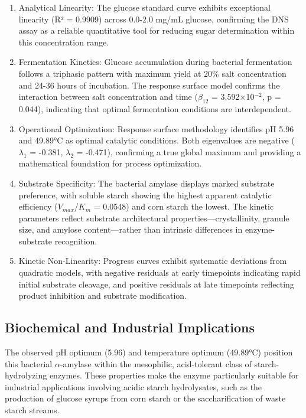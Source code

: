 \documentclass[
  12pt,
]{article}
\begin{document}
\begin{enumerate}
\def\labelenumi{\arabic{enumi}.}
\item
  Analytical Linearity: The glucose standard curve exhibits exceptional
  linearity (R² = 0.9909) across 0.0-2.0 mg/mL glucose, confirming the
  DNS assay as a reliable quantitative tool for reducing sugar
  determination within this concentration range.
\item
  Fermentation Kinetics: Glucose accumulation during bacterial
  fermentation follows a triphasic pattern with maximum yield at 20\%
  salt concentration and 24-36 hours of incubation. The response surface
  model confirms the interaction between salt concentration and time
  (\(\beta_{12}\) = 3.592×10\(^{-2}\), p = 0.044), indicating that
  optimal fermentation conditions are interdependent.
\item
  Operational Optimization: Response surface methodology identifies pH
  5.96 and 49.89°C as optimal catalytic conditions. Both eigenvalues are
  negative (\(\lambda_1\) = -0.381, \(\lambda_2\) = -0.471), confirming
  a true global maximum and providing a mathematical foundation for
  process optimization.
\item
  Substrate Specificity: The bacterial amylase displays marked substrate
  preference, with soluble starch showing the highest apparent catalytic
  efficiency (\(V_{max}\)/\(K_{m}\) = 0.0548) and corn starch the
  lowest. The kinetic parameters reflect substrate architectural
  properties---crystallinity, granule size, and amylose content---rather
  than intrinsic differences in enzyme-substrate recognition.
\item
  Kinetic Non-Linearity: Progress curves exhibit systematic deviations
  from quadratic models, with negative residuals at early timepoints
  indicating rapid initial substrate cleavage, and positive residuals at
  late timepoints reflecting product inhibition and substrate
  modification.
\end{enumerate}

\subsection{Biochemical and Industrial
Implications}\label{biochemical-and-industrial-implications}

The observed pH optimum (5.96) and temperature optimum (49.89°C)
position this bacterial \(\alpha\)-amylase within the mesophilic,
acid-tolerant class of starch-hydrolyzing enzymes. These properties make
the enzyme particularly suitable for industrial applications involving
acidic starch hydrolysates, such as the production of glucose syrups
from corn starch or the saccharification of waste starch streams.
\end{document}
